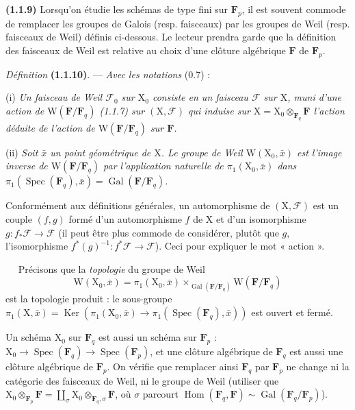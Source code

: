 \documentclass[11pt,leqno]{article}
\newcommand{\Page}[1]{\ifvmode\noindent\else\unskip\ \fi{\footnotesize\textcolor{gray}{[p.\,#1]}}\ \ignorespaces}
\begin{document}
\textbf{(1.1.9)} Lorsqu’on étudie les schémas de type fini sur \(\mathbf{F}_p\), il est souvent commode de remplacer les groupes de Galois (resp. faisceaux) par les groupes de Weil (resp. faisceaux de Weil) définis ci-dessous. Le lecteur prendra garde que la définition des faisceaux de Weil est relative au choix d’une clôture algébrique \(\mathbf{F}\) de \(\mathbf{F}_p\).

\textit{Définition} \textbf{(1.1.10)}. — \textit{Avec les notations} (0.7) :

(i) \textit{Un \textup{faisceau de Weil} \(\mathscr{F}_0\) sur \(\mathrm{X}_0\) consiste en un faisceau \(\mathscr{F}\) sur \(\mathrm{X}\), muni d’une action de \(\mathrm{W}(\mathbf{F}/\mathbf{F}_q)\) \textup{(1.1.7)} sur \((\mathrm{X},\mathscr{F})\) qui induise sur \(\mathrm{X}=\mathrm{X}_0\otimes_{\mathbf{F}_q}\mathbf{F}\) l’action déduite de l’action de \(\mathrm{W}(\mathbf{F}/\mathbf{F}_q)\) sur \(\mathbf{F}\).}

(ii) \textit{Soit \(\bar x\) un point géométrique de \(\mathrm{X}\). Le \textup{groupe de Weil} \(\mathrm{W}(\mathrm{X}_0,\bar x)\) est l’image inverse de \(\mathrm{W}(\mathbf{F}/\mathbf{F}_q)\) par l’application naturelle de \(\pi_1(\mathrm{X}_0,\bar x)\) dans \(\pi_1(\operatorname{Spec}(\mathbf{F}_q),\bar x)=\operatorname{Gal}(\mathbf{F}/\mathbf{F}_q)\).}

Conformément aux définitions générales, un automorphisme de \((\mathrm{X},\mathscr{F})\) est un couple \((f,g)\) formé d’un automorphisme \(f\) de \(\mathrm{X}\) et d’un isomorphisme \(g:f_*\mathscr{F}\to\mathscr{F}\) (il peut être plus commode de considérer, plutôt que \(g\), l’isomorphisme \(f^*(g)^{-1}:f^*\mathscr{F}\to\mathscr{F}\)). Ceci pour expliquer le mot « action ».

\Page{152}
Précisons que la \textit{topologie} du groupe de Weil
\[
\mathrm{W}(\mathrm{X}_0,\bar x)
=\pi_1(\mathrm{X}_0,\bar x)\times_{\operatorname{Gal}(\mathbf{F}/\mathbf{F}_q)}
\mathrm{W}(\mathbf{F}/\mathbf{F}_q)
\]
est la topologie produit : le sous-groupe \(\pi_1(\mathrm{X},\bar x)=\operatorname{Ker}(\pi_1(\mathrm{X}_0,\bar x)\to\pi_1(\operatorname{Spec}(\mathbf{F}_q),\bar x))\) est ouvert et fermé.

Un schéma \(\mathrm{X}_0\) sur \(\mathbf{F}_q\) est aussi un schéma sur \(\mathbf{F}_p\) : \(\mathrm{X}_0\to\operatorname{Spec}(\mathbf{F}_q)\to\operatorname{Spec}(\mathbf{F}_p)\), et une clôture algébrique de \(\mathbf{F}_q\) est aussi une clôture algébrique de \(\mathbf{F}_p\). On vérifie que remplacer ainsi \(\mathbf{F}_q\) par \(\mathbf{F}_p\) ne change ni la catégorie des faisceaux de Weil, ni le groupe de Weil (utiliser que \(\mathrm{X}_0\otimes_{\mathbf{F}_p}\mathbf{F}=\coprod\limits_\sigma\mathrm{X}_0\otimes_{\mathbf{F}_q,\sigma}\mathbf{F}\), où \(\sigma\) parcourt \(\operatorname{Hom}(\mathbf{F}_q,\mathbf{F})\sim\operatorname{Gal}(\mathbf{F}_q/\mathbf{F}_p)\)).
\end{document}
